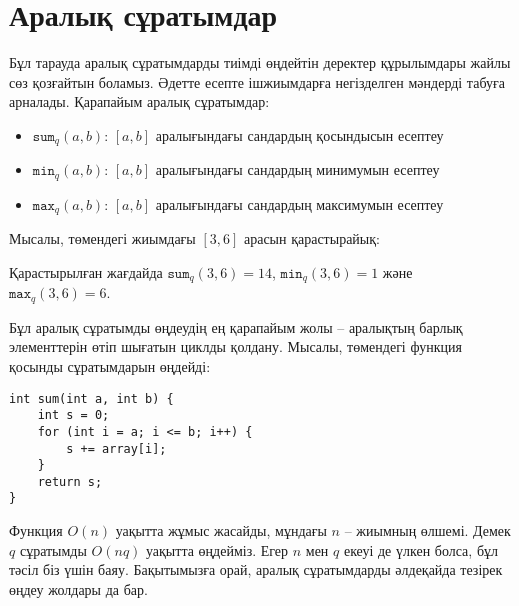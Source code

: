 \chapter{Аралық сұратымдар}


Бұл тарауда аралық сұратымдарды тиімді өңдейтін
деректер құрылымдары жайлы сөз қозғайтын боламыз.
Әдетте  есепте
ішжиымдарға негізделген мәндерді табуға арналады.
Қарапайым аралық сұратымдар:
\begin{itemize}
\item $\texttt{sum}_q(a,b)$: $[a,b]$ аралығындағы сандардың қосындысын есептеу
\item $\texttt{min}_q(a,b)$: $[a,b]$ аралығындағы сандардың минимумын есептеу
\item $\texttt{max}_q(a,b)$: $[a,b]$ аралығындағы сандардың максимумын есептеу
\end{itemize}

Мысалы, төмендегі жиымдағы $[3,6]$ арасын қарастырайық:
\begin{center}
\end{center}
Қарастырылған жағдайда $\texttt{sum}_q(3,6)=14$,
$\texttt{min}_q(3,6)=1$ және $\texttt{max}_q(3,6)=6$.

Бұл аралық сұратымды өңдеудің ең қарапайым жолы --
аралықтың барлық элементтерін өтіп шығатын циклды қолдану.
Мысалы, төмендегі функция қосынды сұратымдарын өңдейді:

\begin{lstlisting}
int sum(int a, int b) {
    int s = 0;
    for (int i = a; i <= b; i++) {
        s += array[i];
    }
    return s;
}
\end{lstlisting}

Функция $O(n)$ уақытта жұмыс жасайды,
мұндағы $n$ -- жиымның өлшемі. Демек $q$ сұратымды
$O(nq)$ уақытта өңдейміз. Егер 
$n$ мен $q$ екеуі де үлкен болса, бұл 
тәсіл біз үшін баяу. Бақытымызға орай, аралық сұратымдарды
әлдеқайда тезірек өңдеу жолдары да бар. 

